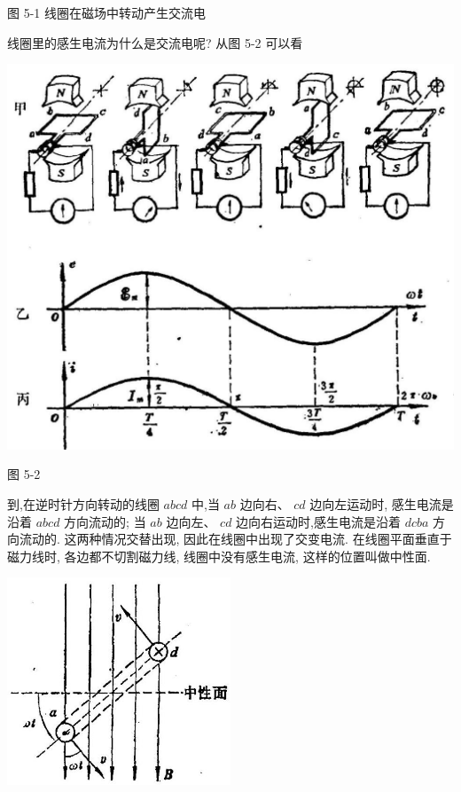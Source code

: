 \documentclass[10pt]{article}
\begin{document}
图 5-1 线圈在磁场中转动产生交流电

线圈里的感生电流为什么是交流电呢? 从图 5-2 可以看

\begin{center}
\includegraphics[max width=1.0\textwidth]{images/01913056-1f15-74d8-9184-9aab52c9d66b_160_305152.jpg}
\end{center}

图 5-2

到,在逆时针方向转动的线圈 \({abcd}\) 中,当 \({ab}\) 边向右、 \({cd}\) 边向左运动时, 感生电流是沿着 \({abcd}\) 方向流动的; 当 \({ab}\) 边向左、 \({cd}\) 边向右运动时,感生电流是沿着 \({dcba}\) 方向流动的. 这两种情况交替出现, 因此在线圈中出现了交变电流. 在线圈平面垂直于磁力线时, 各边都不切割磁力线, 线圈中没有感生电流, 这样的位置叫做中性面.

\begin{center}
\includegraphics[max width=0.5\textwidth]{images/01913056-1f15-74d8-9184-9aab52c9d66b_161_409570.jpg}
\end{center}
\end{document}
